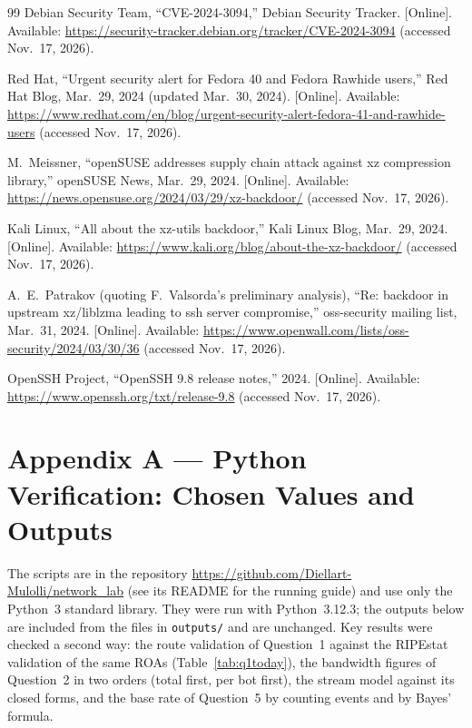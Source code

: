 \documentclass[11pt,a4paper]{article}
\newcommand{\code}[1]{\texttt{#1}}
\begin{document}
\begin{thebibliography}{99}
Debian Security Team, ``CVE-2024-3094,'' Debian Security Tracker. [Online]. Available:
\url{https://security-tracker.debian.org/tracker/CVE-2024-3094} (accessed Nov.~17, 2026).

Red Hat, ``Urgent security alert for Fedora 40 and Fedora Rawhide users,'' Red Hat Blog, Mar.~29, 2024 (updated Mar.~30, 2024). [Online]. Available:
\url{https://www.redhat.com/en/blog/urgent-security-alert-fedora-41-and-rawhide-users} (accessed Nov.~17, 2026).

M.~Meissner, ``openSUSE addresses supply chain attack against xz compression library,'' openSUSE News, Mar.~29, 2024. [Online]. Available:
\url{https://news.opensuse.org/2024/03/29/xz-backdoor/} (accessed Nov.~17, 2026).

Kali Linux, ``All about the xz-utils backdoor,'' Kali Linux Blog, Mar.~29, 2024. [Online]. Available:
\url{https://www.kali.org/blog/about-the-xz-backdoor/} (accessed Nov.~17, 2026).

A.~E.~Patrakov (quoting F.~Valsorda's preliminary analysis), ``Re: backdoor in upstream xz/liblzma leading to ssh server compromise,'' oss-security mailing list, Mar.~31, 2024. [Online]. Available:
\url{https://www.openwall.com/lists/oss-security/2024/03/30/36} (accessed Nov.~17, 2026).

OpenSSH Project, ``OpenSSH 9.8 release notes,'' 2024. [Online]. Available: \url{https://www.openssh.org/txt/release-9.8} (accessed Nov.~17, 2026).

\end{thebibliography}

\clearpage
\section*{Appendix A --- Python Verification: Chosen Values and Outputs}
The scripts are in the repository \url{https://github.com/Diellart-Mulolli/network_lab} (see its README for the running guide)
and use only the Python~3 standard library. They were run with Python~3.12.3; the outputs below are included from the
files in \code{outputs/} and are unchanged. Key results were checked a second way: the route validation of Question~1 against the RIPEstat validation of
the same ROAs (Table~\ref{tab:q1today}), the bandwidth figures of Question~2 in two orders (total first, per bot first), the stream model against its closed forms,
and the base rate of Question~5 by counting events and by Bayes' formula.
\end{document}
